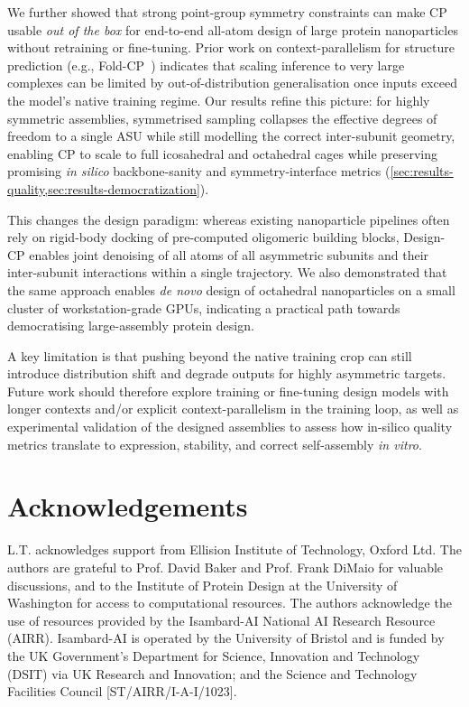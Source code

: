\documentclass{article}
\theoremstyle{plain}
\theoremstyle{definition}
\theoremstyle{remark}
\begin{document}
We further showed that strong point-group symmetry constraints can make CP usable \emph{out of the box} for end-to-end all-atom design of large protein nanoparticles without retraining or fine-tuning. Prior work on context-parallelism for structure prediction (e.g., Fold-CP~\cite{lin_fold-cp_2026}) indicates that scaling inference to very large complexes can be limited by out-of-distribution generalisation once inputs exceed the model's native training regime. Our results refine this picture: for highly symmetric assemblies, symmetrised sampling collapses the effective degrees of freedom to a single ASU while still modelling the correct inter-subunit geometry, enabling CP to scale to full icosahedral and octahedral cages while preserving promising \emph{in silico} backbone-sanity and symmetry-interface metrics (\cref{sec:results-quality,sec:results-democratization}).

This changes the design paradigm: whereas existing nanoparticle pipelines often rely on rigid-body docking of pre-computed oligomeric building blocks, Design-CP enables joint denoising of all atoms of all asymmetric subunits and their inter-subunit interactions within a single trajectory. We also demonstrated that the same approach enables \emph{de novo} design of octahedral nanoparticles on a small cluster of workstation-grade GPUs, indicating a practical path towards democratising large-assembly protein design.

A key limitation is that pushing beyond the native training crop can still introduce distribution shift and degrade outputs for highly asymmetric targets. Future work should therefore explore training or fine-tuning design models with longer contexts and/or explicit context-parallelism in the training loop, as well as experimental validation of the designed assemblies to assess how in-silico quality metrics translate to expression, stability, and correct self-assembly \emph{in vitro}.

\section*{Acknowledgements}
L.T. acknowledges support from Ellision Institute of Technology, Oxford Ltd. The authors are grateful to Prof. David Baker and Prof. Frank DiMaio for valuable discussions, and to the Institute of Protein Design at the University of Washington for access to computational resources. The authors acknowledge the use of resources provided by the Isambard-AI National AI Research Resource (AIRR). Isambard-AI is operated by the University of Bristol and is funded by the UK Government’s Department for Science, Innovation and Technology (DSIT) via UK Research and Innovation; and the Science and Technology Facilities Council [ST/AIRR/I-A-I/1023].
\end{document}

